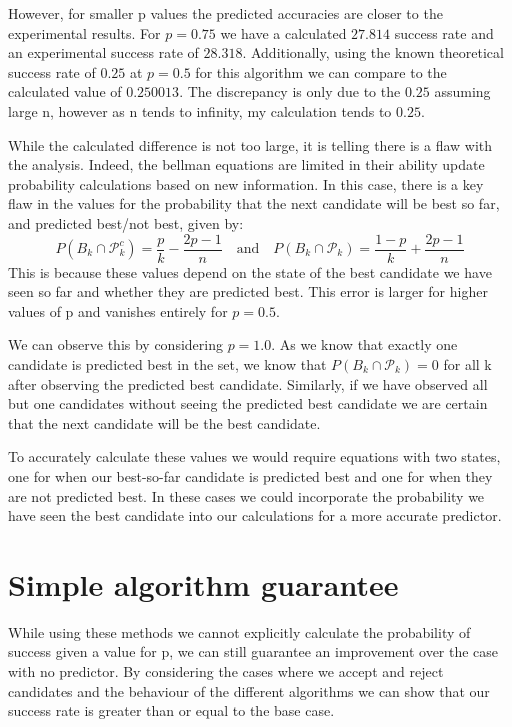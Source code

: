 \documentclass[a4paper,11pt]{article}
\begin{document}
However, for smaller p values the predicted accuracies are closer to the experimental results. For $p=0.75$ we have a calculated $27.814$ success rate and an experimental success rate of $28.318$. Additionally, using the known theoretical success rate of $0.25$ at $p=0.5$ for this algorithm we can compare to the calculated value of $0.250013$. The discrepancy is only due to the $0.25$ assuming large n, however as n tends to infinity, my calculation tends to $0.25$.

While the calculated difference is not too large, it is telling there is a flaw with the analysis. Indeed, the bellman equations are limited in their ability update probability calculations based on new information. In this case, there is a key flaw in the values for the probability that the next candidate will be best so far, and predicted best/not best, given by: 
$$
P(B_{k} \cap \mathcal{P}_{k}^c) = \frac{p}{k} - \frac{2p-1}{n} \quad \text{and} \quad P(B_{k} \cap \mathcal{P}_{k})=\frac{1-p}{k} + \frac{2p-1}{n}
$$
This is because these values depend on the state of the best candidate we have seen so far and whether they are predicted best. This error is larger for higher values of p and vanishes entirely for $p = 0.5$.

We can observe this by considering $p=1.0$. As we know that exactly one candidate is predicted best in the set, we know that $P(B_{k} \cap \mathcal{P}_{k}) = 0$ for all k after observing the predicted best candidate. Similarly, if we have observed all but one candidates without seeing the predicted best candidate we are certain that the next candidate will be the best candidate.

To accurately calculate these values we would require equations with two states, one for when our best-so-far candidate is predicted best and one for when they are not predicted best. In these cases we could incorporate the probability we have seen the best candidate into our calculations for a more accurate predictor.

\section{Simple algorithm guarantee}

While using these methods we cannot explicitly calculate the probability of success given a value for p, we can still guarantee an improvement over the case with no predictor. By considering the cases where we accept and reject candidates and the behaviour of the different algorithms we can show that our success rate is greater than or equal to the base case.
\end{document}
